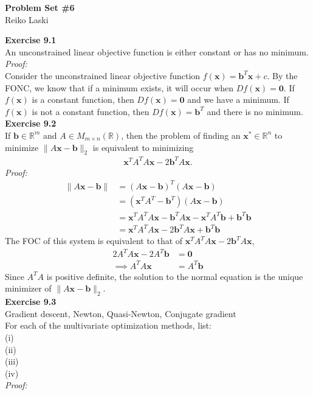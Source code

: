 \documentclass[letterpaper,12pt]{article}
\let\vec\mathbf
\theoremstyle{definition}
\begin{document}
\begin{flushleft}
  \textbf{\large{Problem Set \#6}} \\
  Reiko Laski
\end{flushleft}

\textbf{Exercise 9.1} \\
An unconstrained linear objective function is either constant or has no minimum. \\
\textit{Proof:} \\
Consider the unconstrained linear objective function $f(\vec{x})=\vec{b}^T\vec{x} + c$. By the FONC, we know that if a minimum exists, it will occur when $Df(\vec{x}) = \vec{0}$. If $f(\vec{x})$ is a constant function, then $Df(\vec{x}) = \vec{0}$ and we have a minimum. If $f(\vec{x})$ is not a constant function, then $Df(\vec{x}) = \vec{b}^T$ and there is no minimum. \\

\textbf{Exercise 9.2} \\
If $\vec{b} \in \mathbb{R}^m$ and $A \in M_{m \times n}(\mathbb{R})$, then the problem of finding an $\vec{x}^* \in \mathbb{R}^n$ to minimize $\|A\vec{x} - \vec{b}\|_2$ is equivalent to minimizing
\begin{align*}
  \vec{x}^TA^TA\vec{x} - 2\vec{b}^TA\vec{x}.
\end{align*}
\textit{Proof:}
\begin{align*}
  \|A\vec{x} - \vec{b}\| &= (A\vec{x} - \vec{b})^T(A\vec{x} - \vec{b})
  \\
  &= (\vec{x}^TA^T - \vec{b}^T)(A\vec{x} - \vec{b})
  \\
  &= \vec{x}^TA^TA\vec{x} - \vec{b}^TA\vec{x} -\vec{x}^TA^T\vec{b} + \vec{b}^T\vec{b}
  \\
  &= \vec{x}^TA^TA\vec{x} - 2\vec{b}^TA\vec{x} + \vec{b}^T\vec{b}
\end{align*}
The FOC of this system is equivalent to that of $\vec{x}^TA^TA\vec{x} - 2\vec{b}^TA\vec{x}$,
\begin{align*}
  2A^TA\vec{x} - 2A^T\vec{b} &= \vec{0}
  \\
  \implies A^TA\vec{x} &= A^T\vec{b}
\end{align*}
Since $A^TA$ is positive definite, the solution to the normal equation is the unique minimizer of $\|A\vec{x} - \vec{b}\|_2$. \\

\textbf{Exercise 9.3} \\
Gradient descent, Newton, Quasi-Newton, Conjugate gradient \\
For each of the multivariate optimization methods, list: \\
(i) \\
(ii) \\
(iii) \\
(iv) \\
\textit{Proof:} \\
\end{document}
